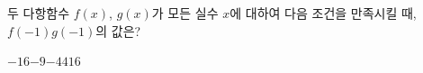 두 다항함수 $f(x)$, $g(x)$가 모든 실수 $x$에 대하여 다음 조건을 만족시킬 때, $f(-1)g(-1)$의 값은? 
\begin{choices32}{$-16$}{$-9$}{$-4$}{$4$}{$16$}\end{choices32}
